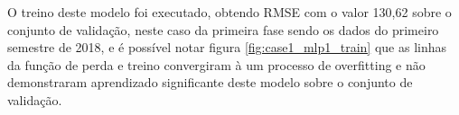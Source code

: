         O treino deste modelo foi executado, obtendo RMSE com o valor 130,62 sobre o conjunto de validação, neste caso da primeira fase sendo os dados do primeiro semestre de 2018, e é possível notar figura \ref{fig:case1_mlp1_train} que as linhas da função de perda e treino convergiram à um processo de overfitting e não demonstraram aprendizado significante deste modelo sobre o conjunto de validação.
        \begin{figure}[H]
        \end{figure}
        
